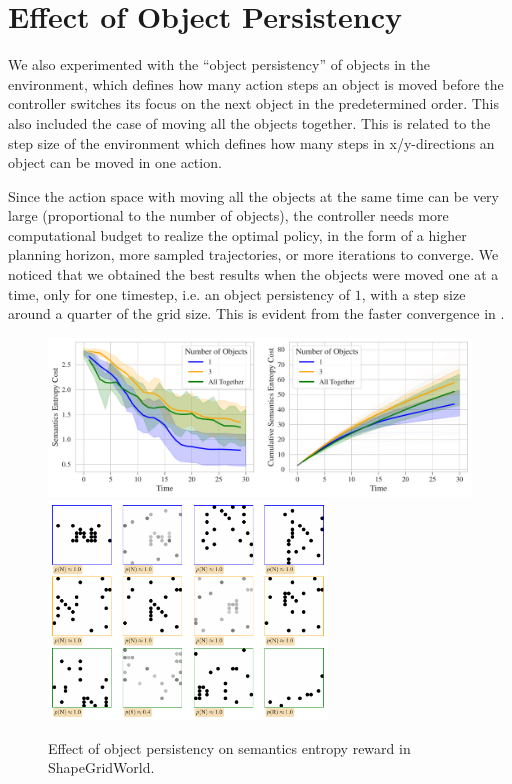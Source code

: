 \newpage
\section{Effect of Object Persistency}
\label{sec:sgw-persistency}

We also experimented with the ``object persistency'' of objects in the environment, which defines how many action steps an object is moved before the controller switches its focus on the next object in the predetermined order.
This also included the case of moving all the objects together.
This is related to the step size of the environment which defines how many steps in x/y-directions an object can be moved in one action.

Since the action space with moving all the objects at the same time can be very large (proportional to the number of objects), the controller needs more computational budget to realize the optimal policy, in the form of a higher planning horizon, more sampled trajectories, or more iterations to converge.
We noticed that we obtained the best results when the objects were moved one at a time, only for one timestep, i.e. an object persistency of \(1\), with a step size around a quarter of the grid size.
This is evident from the faster convergence in .

\begin{figure}[h]
    \centering
    \includegraphics[width=\textwidth]{images/object_persistency_comparison_sgw.pdf}
    \vspace{12pt}
    \includegraphics[width=0.66\textwidth]{images/object_persistency_samples_sgw.pdf}
    \caption{Effect of object persistency on semantics entropy reward in ShapeGridWorld.}
    \label{fig:object-persistency-sgw}
\end{figure}


